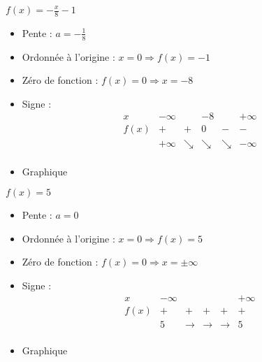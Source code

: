 \begin{solution}
$f(x)=-\frac{x}{8}-1$
\begin{itemize}
\item Pente :	$a=-\frac{1}{8}$
\item Ordonnée à l’origine :	$x=0\Rightarrow f(x)=-1$
\item Zéro de fonction :	$f(x)=0\Rightarrow x=-8$
\item Signe :	
$$\begin{array}{l|l|l|l|l|l}
x    & -\infty &   & -8 &   & +\infty \\
\hline
f(x) & +       & + & 0  & - & -   \\
 & +\infty & \searrow & \searrow & \searrow & -\infty \\   
\end{array}$$
\item Graphique
\end{itemize}
\end{solution}

\begin{solution}
$f(x)=5$
\begin{itemize}
\item Pente :	$a=0$
\item Ordonnée à l’origine :	$x=0\Rightarrow f(x)=5$
\item Zéro de fonction :	$f(x)=0\Rightarrow x=\pm \infty $
\item Signe :	$$\begin{array}{l|l|l|l|l|l}
x    & -\infty &   & &   & +\infty \\
\hline
f(x) & +       & + & +  & + & +   \\
 & 5 & \rightarrow & \rightarrow & \rightarrow & 5 \\   
\end{array}$$
\item Graphique
\end{itemize}
\end{solution}

